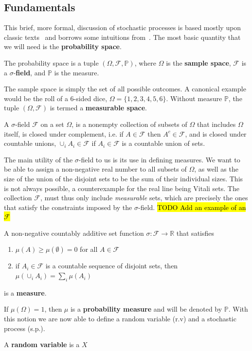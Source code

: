 \subsection{Fundamentals}
This brief, more formal, discussion of stochastic processes is based mostly upon classic texts~\cite{durrett2019probability, rogers1994diffusions, rogers2000diffusions} and borrows some intuitions from~\cite{sarkka2019applied}. The most basic quantity that we will need is the \textbf{probability space}. 
\begin{definition}
	The probability space is a tuple $(\Omega, \mathcal{F}, \mathbb{P})$, where $\Omega$ is the \textbf{sample space}, $\mathcal{F}$ is a $\sigma$-\textbf{field}, and $\mathbb{P}$ is the measure.
\end{definition}
The sample space is simply the set of all possible outcomes. A canonical example would be the roll of a 6-sided dice, $\Omega=\{1, 2, 3, 4, 5, 6\}$. Without measure $\mathbb{P}$, the tuple $(\Omega, \mathcal{F})$ is termed a \textbf{measurable space}.
\begin{definition}
	A $\sigma$-field $\mathcal{F}$ on a set $\Omega$, is a nonempty collection of subsets of $\Omega$ that includes $\Omega$ itself, is closed under complement, i.e. if $A \in \mathcal{F}$ then $A^c \in \mathcal{F}$, and is closed under countable unions, $\cup_{i} A_{i} \in \mathcal{F}$ if $A_{i} \in \mathcal{F}$ is a countable union of sets.
\end{definition}
The main utility of the $\sigma$-field to us is its use in defining measures. We want to be able to assign a non-negative real number to all subsets of $\Omega$, as well as the size of the union of the disjoint sets to be the sum of their individual sizes. This is not always possible, a counterexample for the real line being Vitali sets. The collection $\mathcal{F}$, must thus only include \emph{measurable} sets, which are precisely the ones that satisfy the constraints imposed by the $\sigma$-field. \hl{TODO Add an example of an $\mathcal{F}$}
\begin{definition}[Measure]
	A non-negative countably additive set function $\sigma: \mathcal{F} \rightarrow \mathbb{R}$ that satisfies
	\begin{enumerate}[label=\roman*]
		\item $\mu(A) \geq \mu(\emptyset)=0$ for all $A \in \mathcal{F}$
		\item if $A_{i} \in \mathcal{F}$ is a countable sequence of disjoint sets, then $\mu\left(\cup_{i} A_{i}\right)=\sum_{i} \mu\left(A_{i}\right)$
	\end{enumerate}
	is a \textbf{measure}.
\end{definition}
If $\mu(\Omega)=1$, then $\mu$ is a \textbf{probability measure} and will be denoted by $\mathbb{P}$. With this notion we are now able to define a random variable (r.v) and a stochastic process (s.p.).
\begin{definition}
	A \textbf{random variable} is a $X$
\end{definition}

